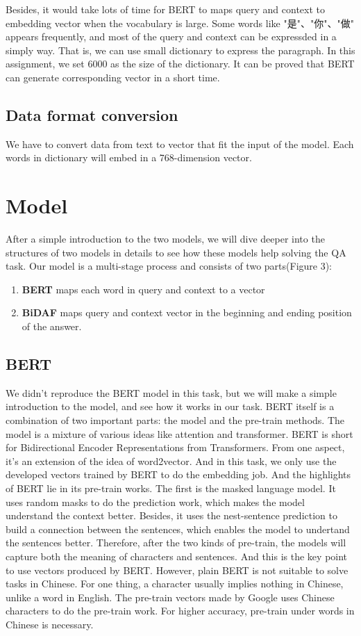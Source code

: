 \documentclass{article}
\begin{document}
Besides, it would take lots of time for BERT to maps query and context to embedding vector when the vocabulary is large. Some words like "是"、"你"、"做" appears frequently, and most of the query and context can be expressded in a simply way. That is, we can use small dictionary to express the paragraph. In this assignment, we set 6000 as the size of the dictionary. It can be proved that BERT can generate corresponding vector in a short time.
\subsection{Data format conversion}
We have to convert data from text to vector that fit the input of the model. Each words in dictionary will embed in a 768-dimension vector. 

\section{Model}
After a simple introduction to the two models, we will dive deeper into the structures of two models in details to see how these models help solving the QA task.
\noindent Our model is a multi-stage process and consists of two parts(Figure 3):\\
\begin{enumerate}
	\item \textbf{BERT} maps each word in query and context to a vector  
	\item \textbf{BiDAF} maps query and context vector in the beginning and ending position of the answer.
\end{enumerate}
\subsection{BERT}
We didn't reproduce the BERT model in this task, but we will make a simple introduction to the model, and see how it works in our task. 
BERT itself is a combination of two important parts: the model and the pre-train methods. 
The model is a mixture of various ideas like attention and transformer. BERT is short for Bidirectional Encoder Representations from Transformers. From one aspect, it's an extension of the idea of word2vector. And in this task, we only use the developed vectors trained by BERT to do the embedding job. 
And the highlights of BERT lie in its pre-train works. The first is the masked language model. It uses random masks to do the prediction work, which makes the model understand the context better. Besides, it uses the nest-sentence prediction to build a connection between the sentences, which enables the model to undertand the sentences better. Therefore, after the two kinds of pre-train, the models will capture both the meaning of characters and sentences. And this is the key point to use vectors produced by BERT.
However, plain BERT is not suitable to solve tasks in Chinese. For one thing, a character usually implies nothing in Chinese, unlike a word in English. The pre-train vectors made by Google uses Chinese characters to do the pre-train work. For higher accuracy, pre-train under words in Chinese is necessary.
\end{document}
